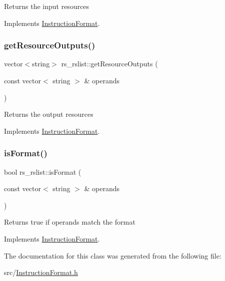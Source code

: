 Returns the input resources 

Implements \hyperlink{classInstructionFormat_a09775d3a3c22f40a0f44504664e586e4}{Instruction\+Format}.

\mbox{\label{classrs__rslist_aec1bc27b2d4f484cc2f2c65dd29f8db2}} 
\subsubsection{\texorpdfstring{get\+Resource\+Outputs()}{getResourceOutputs()}}
{\footnotesize\ttfamily vector$<$string$>$ rs\+\_\+rslist\+::get\+Resource\+Outputs (\begin{DoxyParamCaption}\item[{const vector$<$ string $>$ \&}]{operands }\end{DoxyParamCaption})\hspace{0.3cm}{\ttfamily [virtual]}}

Returns the output resources 

Implements \hyperlink{classInstructionFormat_a95cd28ffb1bde59b67f676880ab10536}{Instruction\+Format}.

\mbox{\label{classrs__rslist_a761f3da0f588fcd4e93e446c98d4c263}} 
\subsubsection{\texorpdfstring{is\+Format()}{isFormat()}}
{\footnotesize\ttfamily bool rs\+\_\+rslist\+::is\+Format (\begin{DoxyParamCaption}\item[{const vector$<$ string $>$ \&}]{operands }\end{DoxyParamCaption})\hspace{0.3cm}{\ttfamily [virtual]}}

Returns true if operands match the format 

Implements \hyperlink{classInstructionFormat_a9fdcf94dcd7d9a55ba86e7a63f04d1fe}{Instruction\+Format}.



The documentation for this class was generated from the following file\+:\begin{DoxyCompactItemize}
\item 
src/\hyperlink{InstructionFormat_8h}{Instruction\+Format.\+h}\end{DoxyCompactItemize}
